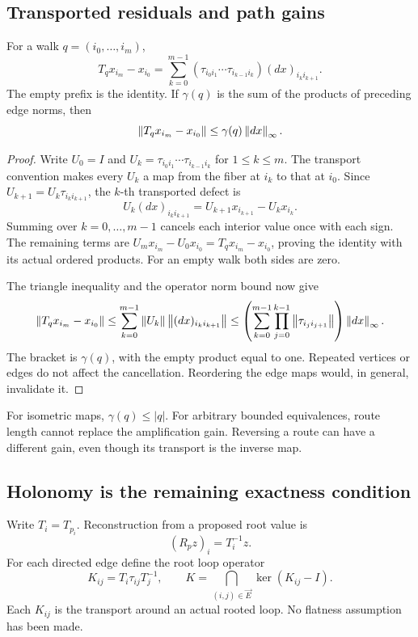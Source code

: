 \subsection{Transported residuals and path gains}
\begin{KSproposition}\label{KS:KS40}
For a walk \(q=(i_0,\ldots,i_m)\),
\[
 T_qx_{i_m}-x_{i_0}
 =\sum_{k=0}^{m-1}
 (\tau_{i_0i_1}\cdots\tau_{i_{k-1}i_k})(dx)_{i_ki_{k+1}}.
\]
The empty prefix is the identity. If \(\gamma(q)\) is the sum of the products of preceding edge norms, then
\[
 \left\lVert T_qx_{i_m}-x_{i_0}\right\rVert\le\gamma(q)\left\lVert dx\right\rVert_\infty.
\]
\end{KSproposition}
\begin{proof}
Write \(U_0=I\) and \(U_k=\tau_{i_0i_1}\cdots\tau_{i_{k-1}i_k}\) for \(1\le k\le m\). The transport convention makes every \(U_k\) a map from the fiber at \(i_k\) to that at \(i_0\). Since \(U_{k+1}=U_k\tau_{i_ki_{k+1}}\), the \(k\)-th transported defect is
\[
 U_k(dx)_{i_ki_{k+1}}
 =U_{k+1}x_{i_{k+1}}-U_kx_{i_k}.
\]
Summing over \(k=0,\ldots,m-1\) cancels each interior value once with each sign. The remaining terms are \(U_mx_{i_m}-U_0x_{i_0}=T_qx_{i_m}-x_{i_0}\), proving the identity with its actual ordered products. For an empty walk both sides are zero.

The triangle inequality and the operator norm bound now give
\[
 \left\lVert T_qx_{i_m}-x_{i_0}\right\rVert
 \le\sum_{k=0}^{m-1}\left\lVert U_k\right\rVert\left\lVert(dx)_{i_ki_{k+1}}\right\rVert
 \le\left(\sum_{k=0}^{m-1}\prod_{j=0}^{k-1}\left\lVert\tau_{i_ji_{j+1}}\right\rVert\right)\left\lVert dx\right\rVert_\infty.
\]
The bracket is \(\gamma(q)\), with the empty product equal to one. Repeated vertices or edges do not affect the cancellation. Reordering the edge maps would, in general, invalidate it.
\end{proof}
For isometric maps, \(\gamma(q)\le|q|\). For arbitrary bounded equivalences, route length cannot replace the amplification gain. Reversing a route can have a different gain, even though its transport is the inverse map.

\subsection{Holonomy is the remaining exactness condition}
Write \(T_i=T_{p_i}\). Reconstruction from a proposed root value is
\[
 (R_pz)_i=T_i^{-1}z.
\]
For each directed edge define the root loop operator
\[
 K_{ij}=T_i\tau_{ij}T_j^{-1},\qquad
 K=\bigcap_{(i,j)\in\vec E}\ker(K_{ij}-I).
\]
Each \(K_{ij}\) is the transport around an actual rooted loop. No flatness assumption has been made.

